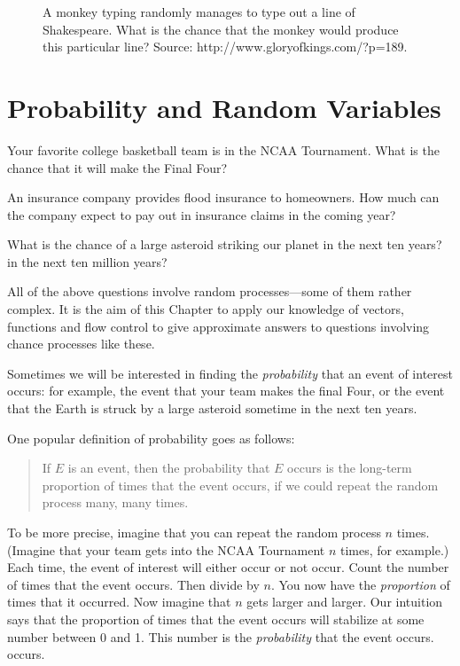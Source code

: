 \documentclass[]{book}
\theoremstyle{definition}
\theoremstyle{definition}
\theoremstyle{definition}
\theoremstyle{remark}
\begin{document}
{\begin{figure}[!h]
{}

\caption{A monkey typing randomly manages to type out a line of Shakespeare.  What is the chance that the monkey would produce this particular line?  Source: http://www.gloryofkings.com/?p=189.}\label{fig:monkey-typewriter}
\end{figure}

\newpage

\section{Probability and Random
Variables}\label{probability-and-random-variables}

Your favorite college basketball team is in the NCAA Tournament. What is
the chance that it will make the Final Four?

An insurance company provides flood insurance to homeowners. How much
can the company expect to pay out in insurance claims in the coming
year?

What is the chance of a large asteroid striking our planet in the next
ten years? in the next ten million years?

All of the above questions involve random processes---some of them
rather complex. It is the aim of this Chapter to apply our knowledge of
vectors, functions and flow control to give approximate answers to
questions involving chance processes like these.

Sometimes we will be interested in finding the \emph{probability} that
an event of interest occurs: for example, the event that your team makes
the final Four, or the event that the Earth is struck by a large
asteroid sometime in the next ten years.

One popular definition of probability goes as
follows:

\begin{quote}
If \(E\) is an event, then the probability that \(E\) occurs is the
long-term proportion of times that the event occurs, if we could repeat
the random process many, many times.
\end{quote}

To be more precise, imagine that you can repeat the random process \(n\)
times. (Imagine that your team gets into the NCAA Tournament \(n\)
times, for example.) Each time, the event of interest will either occur
or not occur. Count the number of times that the event occurs. Then
divide by \(n\). You now have the \emph{proportion} of times that it
occurred. Now imagine that \(n\) gets larger and larger. Our intuition
says that the proportion of times that the event occurs will stabilize
at some number between 0 and 1. This number is the \emph{probability}
that the event occurs. occurs.

}
\end{document}

